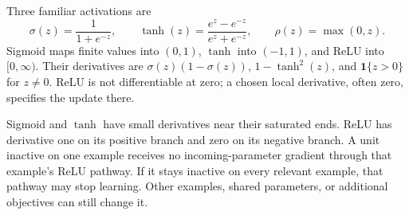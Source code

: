 Three familiar activations are
\[
\sigma(z)=\frac1{1+e^{-z}},\qquad
\tanh(z)=\frac{e^z-e^{-z}}{e^z+e^{-z}},\qquad
\rho(z)=\max(0,z).
\]
Sigmoid maps finite values into $(0,1)$, $\tanh$ into $(-1,1)$, and ReLU into $[0,\infty)$. Their derivatives are $\sigma(z)(1-\sigma(z))$, $1-\tanh^2(z)$, and $\mathbf1\{z>0\}$ for $z\ne0$. ReLU is not differentiable at zero; a chosen local derivative, often zero, specifies the update there.

\par\addvspace{\intextsep}\noindent\begin{minipage}{\linewidth}
\centering
{}
\label{fig:activation-functions}
\end{minipage}\par\addvspace{\intextsep}

Sigmoid and $\tanh$ have small derivatives near their saturated ends. ReLU has derivative one on its positive branch and zero on its negative branch. A unit inactive on one example receives no incoming-parameter gradient through that example's ReLU pathway. If it stays inactive on every relevant example, that pathway may stop learning. Other examples, shared parameters, or additional objectives can still change it.

